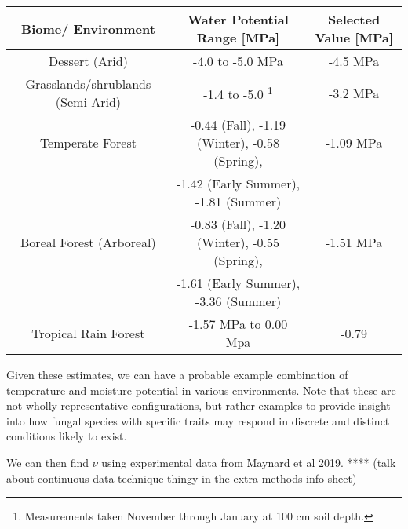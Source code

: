 \documentclass[12pt]{article}
\begin{document}
\begin{savenotes}
	\begin{table}[ht]
		\begin{center}
			\begin{tabular}{|c c c|} 
				\hline
				Biome/ Environment & Water Potential Range [MPa] & Selected Value [MPa] \\ [0.5ex] 
				\hline\hline
				Dessert (Arid) & -4.0 to -5.0 MPa \cite{Nilsen1983} & -4.5 MPa \\ 
				\hline
				Grasslands/shrublands (Semi-Arid) & -1.4 to -5.0 \footnote{Measurements taken November through January at 100 cm soil depth.} \cite{Pelaez1994} & -3.2 MPa\\
				\hline
				Temperate Forest & -0.44 (Fall), -1.19 (Winter), -0.58 (Spring), & -1.09 MPa\\
				&-1.42 (Early Summer), -1.81 (Summer) \cite{Zobel2001}&\\
				\hline
				Boreal Forest (Arboreal) & -0.83 (Fall), -1.20 (Winter), -0.55 (Spring),& -1.51 MPa\\
				&-1.61 (Early Summer), -3.36 (Summer) \cite{Zobel2001} &\\
				\hline
				Tropical Rain Forest & -1.57 MPa to 0.00 Mpa \cite{Kupers2019} & -0.79 \\ 
				\hline
			\end{tabular}
		\end{center}
	\end{table}
\end{savenotes}

Given these estimates, we can have a probable example combination of temperature and moisture potential in various environments. Note that these are not wholly representative configurations, but rather examples to provide insight into how fungal species with specific traits may respond in discrete and distinct conditions likely to exist. 

We can then find $\nu$ using experimental data from Maynard et al 2019. **** (talk about continuous data technique thingy in the extra methods info sheet)
\end{document}
